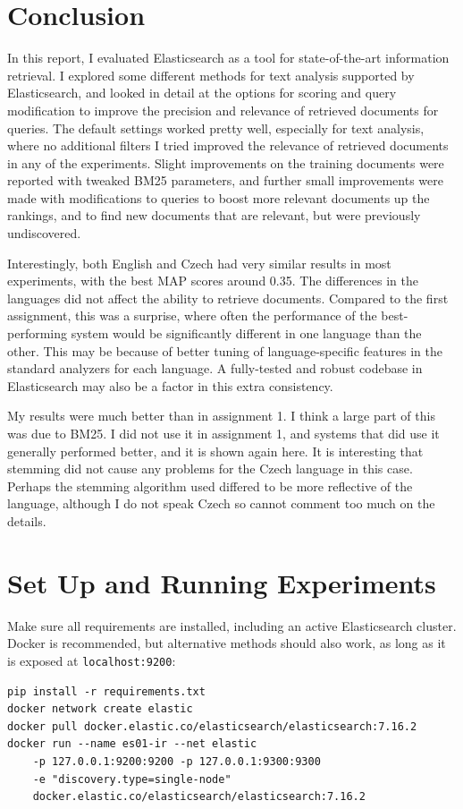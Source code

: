 \documentclass[a4paper]{article}
\begin{document}
\section{Conclusion}
In this report, I evaluated Elasticsearch as a tool for state-of-the-art
information retrieval. I explored some different methods for text analysis
supported by Elasticsearch, and looked in detail at the options for scoring
and query modification to improve the precision and relevance of retrieved
documents for queries. The default settings worked pretty well, especially for
text analysis, where no additional filters I tried improved the relevance of
retrieved documents in any of the experiments. Slight improvements on the
training documents were reported with tweaked BM25 parameters, and further
small improvements were made with modifications to queries to boost more
relevant documents up the rankings, and to find new documents that are relevant,
but were previously undiscovered.

Interestingly, both English and Czech had very similar results in most
experiments, with the best MAP scores around 0.35. The differences in the
languages did not affect the ability to retrieve documents. Compared to
the first assignment, this was a surprise, where often the performance of the
best-performing system would be significantly different in one language than the
other. This may be because of better tuning of language-specific features in
the standard analyzers for each language. A fully-tested and robust codebase
in Elasticsearch may also be a factor in this extra consistency.

My results were much better than in assignment 1. I think a large part of this
was due to BM25. I did not use it in assignment 1, and systems that did use it
generally performed better, and it is shown again here. It is interesting that
stemming did not cause any problems for the Czech language in this case. Perhaps
the stemming algorithm used differed to be more reflective of the language,
although I do not speak Czech so cannot comment too much on the details.

\printbibliography

\newpage

\appendix

\section{Set Up and Running Experiments}

Make sure all requirements are installed, including an active Elasticsearch
cluster. Docker is recommended, but alternative methods should also work, as
long as it is exposed at \texttt{localhost:9200}:
\begin{verbatim}
pip install -r requirements.txt
docker network create elastic
docker pull docker.elastic.co/elasticsearch/elasticsearch:7.16.2
docker run --name es01-ir --net elastic
    -p 127.0.0.1:9200:9200 -p 127.0.0.1:9300:9300
    -e "discovery.type=single-node"
    docker.elastic.co/elasticsearch/elasticsearch:7.16.2
\end{verbatim}
\end{document}
